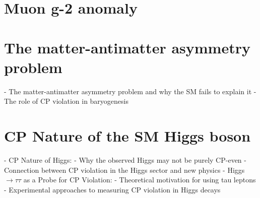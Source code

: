 \section{Muon g-2 anomaly}
\section{The matter-antimatter asymmetry problem}
- The matter-antimatter asymmetry problem and why the SM fails to explain it
- The role of CP violation in baryogenesis
\section{CP Nature of the SM Higgs boson}
- CP Nature of Higgs:
- Why the observed Higgs may not be purely CP-even
- Connection between CP violation in the Higgs sector and new physics
- Higgs $\rightarrow \tau \tau$ as a Probe for CP Violation:
- Theoretical motivation for using tau leptons
- Experimental approaches to measuring CP violation in Higgs decays